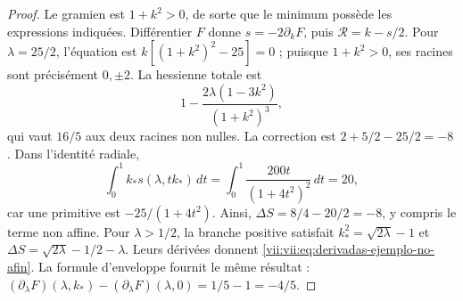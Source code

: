 \begin{proof}
Le gramien est \(1+k^2>0\), de sorte que le minimum possède les expressions indiquées. Différentier \(F\) donne \(s=-2\partial_kF\), puis \(\mathcal R=k-s/2\). Pour \(\lambda=25/2\), l'équation est \(k[(1+k^2)^2-25]=0\) ; puisque \(1+k^2>0\), ses racines sont précisément \(0,\pm2\). La hessienne totale est
\[
 1-\frac{2\lambda(1-3k^2)}{(1+k^2)^3},
\]
qui vaut \(16/5\) aux deux racines non nulles. La correction est
\(2+5/2-25/2=-8\). Dans l'identité radiale,
\[
 \int_0^1 k_*s(\lambda,tk_*)\,dt
    =\int_0^1\frac{200t}{(1+4t^2)^2}\,dt=20,
\]
car une primitive est \(-25/(1+4t^2)\).
Ainsi, \(\Delta S=8/4-20/2=-8\), y compris le terme non affine.
Pour \(\lambda>1/2\), la branche positive satisfait
\(k_*^2=\sqrt{2\lambda}-1\) et
\(\Delta S=\sqrt{2\lambda}-1/2-\lambda\).
Leurs dérivées donnent \eqref{vii:vii:eq:derivadas-ejemplo-no-afin}.
La formule d'enveloppe fournit le même résultat :
\((\partial_\lambda F)(\lambda,k_*)
 -(\partial_\lambda F)(\lambda,0)=1/5-1=-4/5\).
\end{proof}
